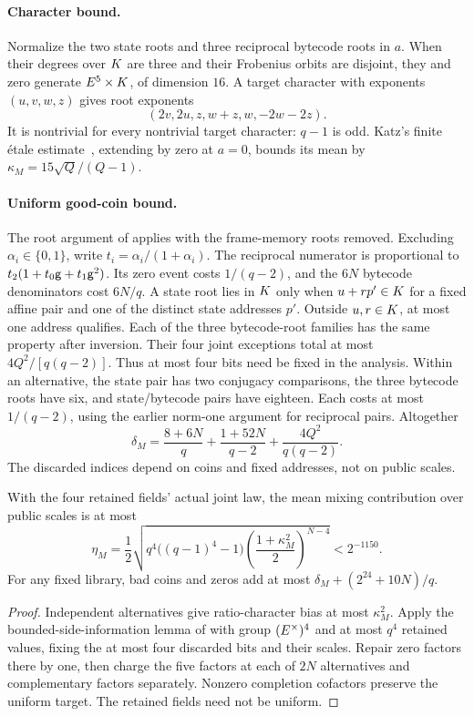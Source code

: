 \paragraph{Character bound.} Normalize the two state roots and three reciprocal bytecode roots in $a$. When their degrees over $K$ are three and their Frobenius orbits are disjoint, they and zero generate $E^5\times K$, of dimension $16$. A target character with exponents $(u,v,w,z)$ gives root exponents
\[
 (2v,2u,z,w+z,w,-2w-2z).
\]
It is nontrivial for every nontrivial target character: $q-1$ is odd. Katz's finite \'etale estimate~\cite{katz}, extending by zero at $a=0$, bounds its mean by $\kappa_M=15\sqrt Q/(Q-1)$.

\paragraph{Uniform good-coin bound.} The root argument of  applies with the frame-memory roots removed. Excluding $\alpha_i\in\{0,1\}$, write $t_i=\alpha_i/(1+\alpha_i)$. The reciprocal numerator is proportional to $t_2(1+t_0\mathsf{g}+t_1\mathsf{g}^2)$. Its zero event costs $1/(q-2)$, and the $6N$ bytecode denominators cost $6N/q$. A state root lies in $K$ only when $u+rp'\in K$ for a fixed affine pair and one of the distinct state addresses $p'$. Outside $u,r\in K$, at most one address qualifies. Each of the three bytecode-root families has the same property after inversion. Their four joint exceptions total at most $4Q^2/[q(q-2)]$. Thus at most four bits need be fixed in the analysis. Within an alternative, the state pair has two conjugacy comparisons, the three bytecode roots have six, and state/bytecode pairs have eighteen. Each costs at most $1/(q-2)$, using the earlier norm-one argument for reciprocal pairs. Altogether
\[
 \delta_M=\frac{8+6N}{q}+\frac{1+52N}{q-2}
                +\frac{4Q^2}{q(q-2)}.
\]
The discarded indices depend on coins and fixed addresses, not on public scales.

\begin{lemma}
With the four retained fields' actual joint law, the mean mixing contribution over public scales is at most
\[
 \eta_M=\frac12\sqrt{q^4\bigl((q-1)^4-1\bigr)
       \left(\frac{1+\kappa_M^2}{2}\right)^{N-4}}<2^{-1150}.
\]
For any fixed library, bad coins and zeros add at most $\delta_M+(2^{24}+10N)/q$.
\end{lemma}
\begin{proof}
Independent alternatives give ratio-character bias at most $\kappa_M^2$. Apply the bounded-side-information lemma of  with group $(E^\times)^4$ and at most $q^4$ retained values, fixing the at most four discarded bits and their scales. Repair zero factors there by one, then charge the five factors at each of $2N$ alternatives and complementary factors separately. Nonzero completion cofactors preserve the uniform target. The retained fields need not be uniform.
\end{proof}

